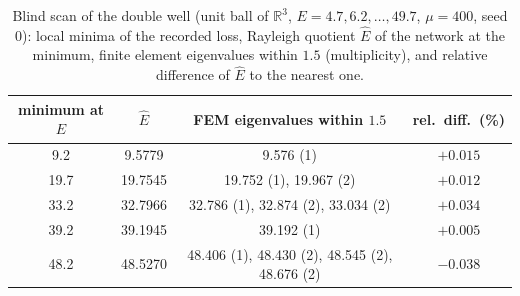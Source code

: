 \documentclass[10pt]{amsart}
\theoremstyle{definition}
\theoremstyle{remark}
\theoremstyle{plain}
\newcommand{\R}{\mathbb{R}}
\begin{document}
\begin{table}[tbp]
\centering\small
\caption{Blind scan of the double well (unit ball of $\R^3$, $E=4.7,6.2,\dots,49.7$, $\mu=400$, seed 0): local minima of the recorded loss, Rayleigh quotient $\hat E$ of the network at the minimum, finite element eigenvalues within $1.5$ (multiplicity), and relative difference of $\hat E$ to the nearest one.}
\label{table.blind}
\begin{tabular}{cccc}
\toprule
minimum at $E$ & $\hat E$ & FEM eigenvalues within $1.5$ & rel.\ diff.\ (\%)\\
\midrule
9.2 & 9.5779 & 9.576 (1) & $+0.015$\\
19.7 & 19.7545 & 19.752 (1), 19.967 (2) & $+0.012$\\
33.2 & 32.7966 & 32.786 (1), 32.874 (2), 33.034 (2) & $+0.034$\\
39.2 & 39.1945 & 39.192 (1) & $+0.005$\\
48.2 & 48.5270 & 48.406 (1), 48.430 (2), 48.545 (2), 48.676 (2) & $-0.038$\\
\bottomrule
\end{tabular}
\end{table}
\end{document}
